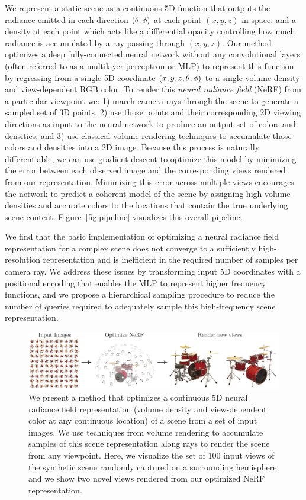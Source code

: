 \documentclass[runningheads]{llncs}
\begin{document}
We represent a static scene as a continuous 5D function that outputs the radiance emitted in each direction $(\theta,\phi)$ at each point $(x,y,z)$ in space, and a density at each point which acts like a differential opacity controlling how much radiance is accumulated by a ray passing through $(x,y,z)$.
Our method optimizes a deep fully-connected neural network without any convolutional layers (often referred to as a multilayer perceptron or MLP) to represent this function by regressing from a single 5D coordinate $(x,y,z,\theta,\phi)$ to a single volume density and view-dependent RGB color. 
To render this \emph{neural radiance field} (NeRF) from a particular viewpoint we:
1) march camera rays through the scene to generate a sampled set of 3D points,
2) use those points and their corresponding 2D viewing directions as input to the neural network to produce an output set of colors and densities, and
3) use classical volume rendering techniques to accumulate those colors and densities into a 2D image.
Because this process is naturally differentiable, we can use gradient descent to optimize this model by minimizing the error between each observed image and the corresponding views rendered from our representation. Minimizing this error across multiple views encourages the network to predict a coherent model of the scene by assigning high volume densities and accurate colors to the locations that contain the true underlying scene content.
Figure~\ref{fig:pipeline} visualizes this overall pipeline.

We find that the basic implementation of optimizing a neural radiance field representation for a complex scene does not converge to a sufficiently high-resolution representation and is inefficient in the required number of samples per camera ray. We address these issues by transforming input 5D coordinates with a positional encoding that enables the MLP to represent higher frequency functions, and we propose a hierarchical sampling procedure to reduce the number of queries required to adequately sample this high-frequency scene representation.

\begin{figure}[t]
\centering
\includegraphics[width=\linewidth]{figs/teaser_small.pdf}
\caption{We present a method that optimizes a continuous 5D neural radiance field representation (volume density and view-dependent color at any continuous location) of a scene from a set of input images. We use techniques from volume rendering to accumulate samples of this scene representation along rays to render the scene from any viewpoint. Here, we visualize the set of 100 input views of the synthetic  scene randomly captured on a surrounding hemisphere, and we show two novel views rendered from our optimized NeRF representation.}
\label{fig:teaser}
\end{figure}
\end{document}
